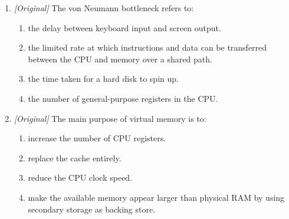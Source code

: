 \begin{enumerate}[label=\textbf{Q\arabic*.}, leftmargin=*]
\begin{enumerate}[label=\Roman*.]
    \item In immediate addressing, the operand is part of the instruction.
    \item The cache-hit ratio equals hits divided by total accesses.
    \item Two's-complement overflow is the same as a carry out of the most
      significant bit.
  \end{enumerate}
  \begin{enumerate}[label=\Alph*.]
    \item I and II only
    \item II and III only
    \item I and III only
    \item I, II, and III
  \end{enumerate}
\item \textit{[Original]} The von Neumann bottleneck refers to:
  \begin{enumerate}[label=\Alph*.]
    \item the delay between keyboard input and screen output.
    \item the limited rate at which instructions and data can be transferred
      between the CPU and memory over a shared path.
    \item the time taken for a hard disk to spin up.
    \item the number of general-purpose registers in the CPU.
  \end{enumerate}
\item \textit{[Original]} The main purpose of virtual memory is to:
  \begin{enumerate}[label=\Alph*.]
    \item increase the number of CPU registers.
    \item replace the cache entirely.
    \item reduce the CPU clock speed.
    \item make the available memory appear larger than physical RAM by using
      secondary storage as backing store.
  \end{enumerate}


\end{enumerate}
